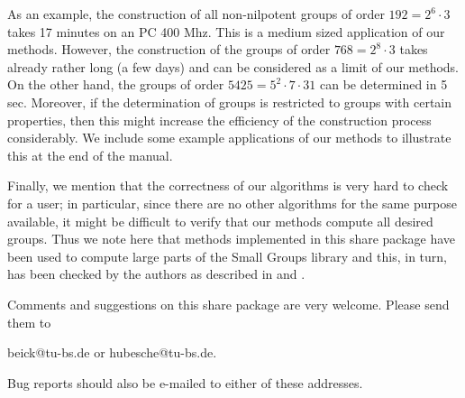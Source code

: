 As an example, the construction of all non-nilpotent groups of order
$192 = 2^6 \cdot 3$ takes 17 minutes on an PC 400 Mhz. This is a medium
sized application of our methods.  However, the construction of the groups
of order $768 = 2^8 \cdot 3$ takes already rather long (a few days) and
can be considered as a limit of our methods. On the other hand, the
groups of order $5425 = 5^2 \cdot 7 \cdot 31$ can be determined in 5 sec.
Moreover, if the determination of groups is restricted to groups
with certain properties, then this might increase the efficiency
of the construction process considerably. We include some example
applications of our methods to illustrate this at the end of the
manual.

Finally, we mention that the correctness of our algorithms is very
hard to check for a user; in particular, since there are no other
algorithms for the same purpose available, it might be difficult to
verify that our methods compute all desired groups. Thus we note here
that methods implemented in this share package have been used to compute
large parts of the Small Groups library and this, in turn, has been
checked by the authors as described in \cite{BE99} and \cite{BE1000}.

Comments and suggestions on this share package are very welcome.
Please send them to

\centerline{ beick@tu-bs.de or hubesche@tu-bs.de.}

Bug reports should also be e-mailed to either of these addresses.


